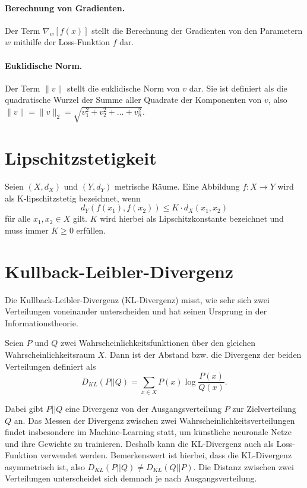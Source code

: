 \paragraph{Berechnung von Gradienten.}
Der Term $\nabla_w\left[f(x)\right]$ stellt die Berechnung der Gradienten von
den Parametern $w$ mithilfe der Loss-Funktion $f$ dar.

\paragraph{Euklidische Norm.}
Der Term $\| v \|$ stellt die euklidische Norm von $v$ dar. Sie ist definiert als die quadratische Wurzel der Summe aller Quadrate der Komponenten von $v$, also $\| v \| = \| v \|_2 = \sqrt{v_1^2 + v_2^2 + ... + v_n^2}$.

\section{Lipschitzstetigkeit}
\begin{definition}[K-Lipschitzstetigkeit]
Seien $(X, d_X)$ und $(Y, d_Y)$ metrische Räume. Eine Abbildung $f: X \to Y$
wird als K-lipschitzstetig bezeichnet, wenn
\[
    d_Y(f(x_1), f(x_2)) \leq K \cdot d_X(x_1, x_2)
\]
für alle $x_1, x_2 \in X$ gilt. $K$ wird hierbei als Lipschitzkonstante
bezeichnet und muss immer $K \geq 0$ erfüllen.
\end{definition}

\section{Kullback-Leibler-Divergenz}
Die Kullback-Leibler-Divergenz (KL-Divergenz) misst, wie sehr sich zwei
Verteilungen voneinander unterscheiden und hat seinen Ursprung in der
Informationstheorie. 
\begin{definition}
Seien $P$ und $Q$ zwei Wahrscheinlichkeitsfunktionen über den gleichen
Wahrscheinlichkeitsraum $X$. Dann ist der Abstand bzw. die Divergenz der
beiden Verteilungen definiert als
\[
    D_{KL}(P \lvert\lvert Q) = \sum_{x \in X} P(x) \log \frac{P(x)}{Q(x)}.
\]
\end{definition}
Dabei gibt $P \lvert\lvert Q$ eine Divergenz von der Ausgangsverteilung $P$
zur Zielverteilung $Q$ an. Das Messen der Divergenz zwischen zwei
Wahrscheinlichkeitsverteilungen findet insbesondere im Machine-Learning statt,
um künstliche neuronale Netze und ihre Gewichte zu trainieren. Deshalb kann
die KL-Divergenz auch als Loss-Funktion verwendet werden. Bemerkenswert ist
hierbei, dass die KL-Divergenz asymmetrisch ist, also $D_{KL}(P \lvert\lvert
Q) \neq D_{KL}(Q \lvert\lvert P)$. Die Distanz zwischen zwei Verteilungen
unterscheidet sich demnach je nach Ausgangsverteilung.

